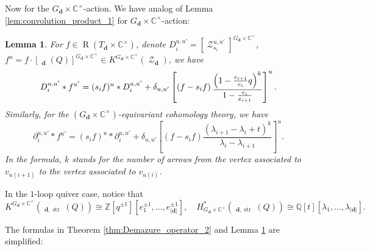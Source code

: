 \documentclass[reqno,11pt]{book}
\numberwithin{equation}{section}
\theoremstyle{plain}
\newtheorem{lemma}[theorem]{Lemma}
\theoremstyle{plain}
\numberwithin{equation}{section}
\theoremstyle{remark}
\DeclareMathOperator{\RRep}{\widetilde{\operatorname{Rep}}}
\DeclareMathOperator{\Rpt}{\operatorname{R}}
\DeclareMathOperator{\St}{\mathcal{Z}}
\DeclareMathOperator{\str}{\operatorname{str}}
\newcommand{\dimvec}[1]{\mathbf{#1}}
\newcommand{\abdimvec}[1]{|\dimvec{#1}|}
\newcommand{\fakestar}{*}
\begin{document}
Now for the $G_{\dimvec{d}} \times \mathbb{C}^{\times}$-action. We have analog of Lemma \ref{lem:convolution_product_1} for $G_{\dimvec{d}} \times \mathbb{C}^{\times}$-action:
\begin{lemma}\label{lem:convolution_product_2}
For $f \in \Rpt(T_{\dimvec{d}} \times \mathbb{C}^{\times})$, denote $D_i^{u,u'} =\left[\St_{s_{i}}^{u,u'}\right]^{G_{\dimvec{d}}\times \mathbb{C}^{\times}}$, $f^{u}=f \cdot \left[ \RRep_{\dimvec{d}}(Q) \right]^{G_{\dimvec{d}}\times \mathbb{C}^{\times}} \in K^{G_{\dimvec{d}}\times \mathbb{C}^{\times}} (\St_{\dimvec{d}})$, we have
$$D_i^{u,u'} \fakestar f^{u'}= (s_i f)^{u} \fakestar D_i^{u,u'} +  \delta_{u,u'}\left[\left(f-s_i f\right) \raisebox{-1mm}{$\displaystyle\frac{\left( 1-\frac{e_{i+1}}{e_{i}} q\right)^{k}}{ 1-\frac{e_{i}}{e_{i+1}}}$}\right]^{u}.$$
Similarly, for the $(G_{\dimvec{d}}\times \mathbb{C}^{\times})$-equivariant cohomology theory, we have
$$\partial_i^{u,u'} \fakestar f^{u'}= (s_i f)^{u} \fakestar \partial_i^{u,u'} +  \delta_{u,u'}\left[\left(f-s_i f\right) 
\frac{\left(\lambda_{i+1}-\lambda_{i}+t\right)^{k}}{\lambda_{i}-\lambda_{i+1}}   \right]^{u}.$$
In the formula, $k$ stands for the number of arrows from the vertex associated to $v_{u(i+1)}$ to the vertex associated to $v_{u(i)}$.
\end{lemma}
In the $1$-loop quiver case, notice that
$$K^{G_{\dimvec{d}} \times \mathbb{C}^{\times}} \left(\RRep_{\dimvec{d},\str}(Q)\right) \cong  \mathbb{Z}\left[q^{\pm 1}\right]\!\left[ e_1^{\pm 1},\ldots,e_{\abdimvec{d}}^{\pm 1} \right], \quad H_{G_{\dimvec{d}}\times \mathbb{C}^{\times}}^{*}\!\!\left(\RRep_{\dimvec{d},\str}(Q)\right) \cong  \mathbb{Q}[t]\left[\lambda_1,\ldots,\lambda_{\abdimvec{d}}\right].$$

The formulas in Theorem \ref{thm:Demazure_operator_2} and Lemma \ref{lem:convolution_product_2} are simplified:
\end{document}
